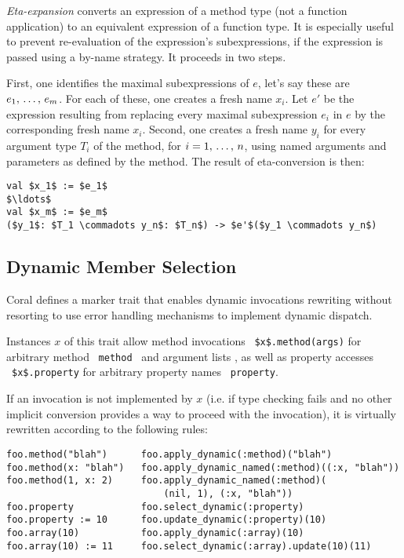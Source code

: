 {\em Eta-expansion} converts an expression of a method type (not a function application) to an equivalent expression of a function type. It is especially useful to prevent re-evaluation of the expression's subexpressions, if the expression is passed using a by-name strategy. It proceeds in two steps. 

First, one identifies the maximal subexpressions of $e$, let's say these are $e_1 ,\, \ldots ,\, e_m$. For each of these, one creates a fresh name $x_i$. Let $e'$ be the expression resulting from replacing every maximal subexpression $e_i$ in $e$ by the corresponding fresh name $x_i$. Second, one creates a fresh name $y_i$ for every argument type $T_i$ of the method, for $i = 1 ,\, \ldots ,\, n$, using named arguments and parameters as defined by the method. The result of eta-conversion is then: 
\begin{lstlisting}
val $x_1$ := $e_1$
$\ldots$
val $x_m$ := $e_m$
($y_1$: $T_1 \commadots y_n$: $T_n$) -> $e'$($y_1 \commadots y_n$)
\end{lstlisting}







\subsection{Dynamic Member Selection}
\label{sec:dynamic-member-selection}

Coral defines a marker trait  that enables dynamic invocations rewriting without resorting to use error handling mechanisms to implement dynamic dispatch. 

Instances $x$ of this trait allow method invocations ~\lstinline[deletekeywords={method}]!$x$.method(args)! for arbitrary method ~\lstinline[deletekeywords={method}]!method!~ and argument lists , as well as property accesses ~\lstinline[deletekeywords={property}]!$x$.property! for arbitrary property names ~\lstinline[deletekeywords={property}]!property!. 

If an invocation is not implemented by $x$ (i.e. if type checking fails and no other implicit conversion provides a way to proceed with the invocation), it is virtually rewritten according to the following rules:

\begin{lstlisting}[deletekeywords={property,method}]
foo.method("blah")      foo.apply_dynamic(:method)("blah")
foo.method(x: "blah")   foo.apply_dynamic_named(:method)((:x, "blah"))
foo.method(1, x: 2)     foo.apply_dynamic_named(:method)(
                            (nil, 1), (:x, "blah"))
foo.property            foo.select_dynamic(:property)
foo.property := 10      foo.update_dynamic(:property)(10)
foo.array(10)           foo.apply_dynamic(:array)(10)
foo.array(10) := 11     foo.select_dynamic(:array).update(10)(11)
\end{lstlisting}






